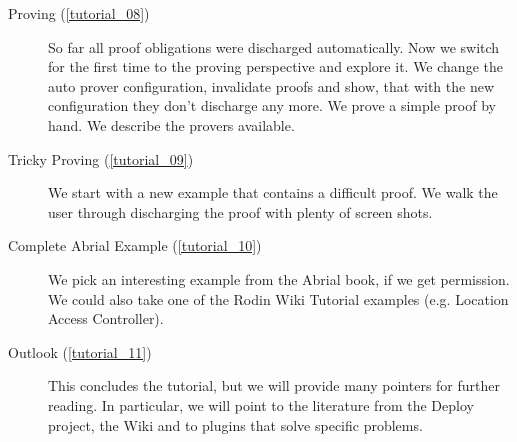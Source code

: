 \begin{description}
	\item[Proving (\ref{tutorial_08})] So far all proof obligations were discharged automatically.  Now we switch for the first time to the proving perspective and explore it.
We change the auto prover configuration, invalidate proofs and show, that with the new configuration they don't discharge any more.  We prove a simple proof by hand.  We describe the provers available.
	\item[Tricky Proving (\ref{tutorial_09})] We start with a new example that contains a difficult proof.  We walk the user through discharging the proof with plenty of screen shots.
	\item[Complete Abrial Example (\ref{tutorial_10})] We pick an interesting example from the Abrial book, if we get permission.  We could also take one of the Rodin Wiki Tutorial examples (e.g. Location Access Controller).
	\item[Outlook (\ref{tutorial_11})] This concludes the tutorial, but we will provide many pointers for further reading.  In particular, we will point to the literature from the Deploy project, the Wiki and to plugins that solve specific problems.
\end{description}

